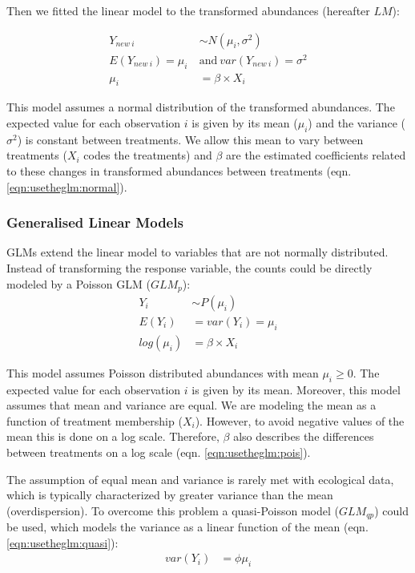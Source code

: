 Then we fitted the linear model to the transformed abundances (hereafter $LM$):

\begin{align}
  Y_{new~i} &\sim N(\mu_i, \sigma^2) \nonumber \\
  E(Y_{new~i}) = \mu_i ~&\text{and}~ var(Y_{new~i}) = \sigma^2 \label{eqn:usetheglm:normal} \\
  \mu_i &= \beta \times X_i  \nonumber
\end{align}

This model assumes a normal distribution of the transformed abundances.
The expected value for each observation $i$ is given by its mean ($\mu_i$) and the variance ($\sigma^2$) is constant between treatments.
We allow this mean to vary between treatments ($X_i$ codes the treatments) and $\beta$ are the estimated coefficients related to these changes in transformed abundances between treatments (eqn. \ref{eqn:usetheglm:normal}).


\subsubsection{Generalised Linear Models}
GLMs extend the linear model to variables that are not normally distributed.
Instead of transforming the response variable, the counts could be directly modeled by a Poisson GLM ($GLM_p$):
\begin{align}
  Y_i &\sim P(\mu_i) \nonumber \\
  E(Y_i) &= var(Y_i) = \mu_i \label{eqn:usetheglm:pois} \\
  log(\mu_i) &= \beta \times X_i  \nonumber
\end{align}

This model assumes Poisson distributed abundances with mean $\mu_i \ge 0$.
The expected value for each observation $i$ is given by its mean. 
Moreover, this model assumes that mean and variance are equal.
We are modeling the mean as a function of treatment membership ($X_i$).
However, to avoid negative values of the mean this is done on a log scale.
Therefore, $\beta$ also describes the differences between treatments on a log scale (eqn. \ref{eqn:usetheglm:pois}).

The assumption of equal mean and variance is rarely met with ecological data, which is typically characterized by greater variance than the mean (overdispersion).
To overcome this problem a quasi-Poisson model ($GLM_{qp}$) could be used, which models the variance as a linear function of the mean (eqn. \ref{eqn:usetheglm:quasi}):
\begin{align}
  var(Y_i) &= \phi \mu_i  \label{eqn:usetheglm:quasi}
\end{align}


